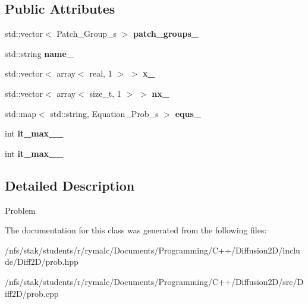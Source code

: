 \subsection*{Public Attributes}
\begin{DoxyCompactItemize}
\item 
\hypertarget{classProb_a63da8c35707c884a7f2960b18e8b5e30}{
std::vector$<$ Patch\_\-Group\_\-s $>$ {\bfseries patch\_\-groups\_\-}}
\label{classProb_a63da8c35707c884a7f2960b18e8b5e30}

\item 
\hypertarget{classProb_af34172c6eced00a603e92e0cf17e4953}{
std::string {\bfseries name\_\-}}
\label{classProb_af34172c6eced00a603e92e0cf17e4953}

\item 
\hypertarget{classProb_ac18ce288649f196b15137b88bfe374de}{
std::vector$<$ array$<$ real, 1 $>$ $>$ {\bfseries x\_\-}}
\label{classProb_ac18ce288649f196b15137b88bfe374de}

\item 
\hypertarget{classProb_a59f92ce7194950bf4c89d00af62c7b51}{
std::vector$<$ array$<$ size\_\-t, 1 $>$ $>$ {\bfseries nx\_\-}}
\label{classProb_a59f92ce7194950bf4c89d00af62c7b51}

\item 
\hypertarget{classProb_ac78ec4ce0542942cbfdb62e2737b149e}{
std::map$<$ std::string, Equation\_\-Prob\_\-s $>$ {\bfseries equs\_\-}}
\label{classProb_ac78ec4ce0542942cbfdb62e2737b149e}

\item 
\hypertarget{classProb_ab683dae1ead4955162ebe4a2194f8a35}{
int {\bfseries it\_\-max\_\_\-}}
\label{classProb_ab683dae1ead4955162ebe4a2194f8a35}

\item 
\hypertarget{classProb_ac344ce6492eb0d3f8b6655aa914982d7}{
int {\bfseries it\_\-max\_\_\-}}
\label{classProb_ac344ce6492eb0d3f8b6655aa914982d7}

\end{DoxyCompactItemize}


\subsection{Detailed Description}
Problem 

The documentation for this class was generated from the following files:\begin{DoxyCompactItemize}
\item 
/nfs/stak/students/r/rymalc/Documents/Programming/C++/Diffusion2D/include/Diff2D/prob.hpp\item 
/nfs/stak/students/r/rymalc/Documents/Programming/C++/Diffusion2D/src/Diff2D/prob.cpp\end{DoxyCompactItemize}
